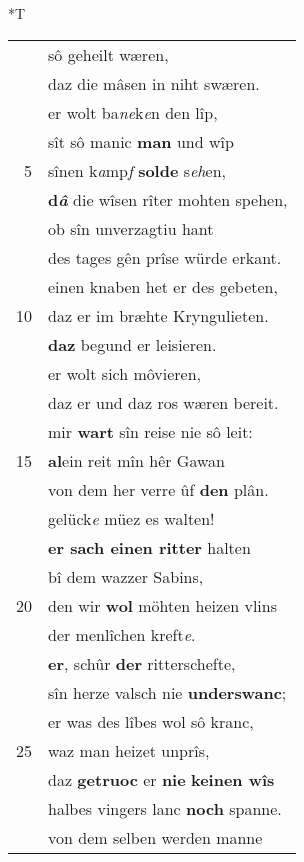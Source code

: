 \documentclass[8pt,a4paper,notitlepage]{article}
\begin{document}
\begin{table}[ht]
\hspace{0.5cm}
\begin{minipage}[t]{0.5\linewidth}
\small
\begin{center}*T
\end{center}
\begin{tabular}{rl}
 & sô geheilt wæren,\\ 
 & daz die mâsen in niht swæren.\\ 
 & er wolt ba\textit{ne}k\textit{e}n den lîp,\\ 
 & sît sô manic \textbf{man} und wîp\\ 
5 & sînen k\textit{a}mp\textit{f} \textbf{solde} s\textit{eh}en,\\ 
 & \textbf{d\textit{â}} die wîsen rîter mohten spehen,\\ 
 & ob sîn unverzagtiu hant\\ 
 & des tages gên prîse würde erkant.\\ 
 & einen knaben het er des gebeten,\\ 
10 & daz er im bræhte Kryngulieten.\\ 
 & \textbf{daz} begund er leisieren.\\ 
 & er wolt sich môvieren,\\ 
 & daz er und daz ros wæren bereit.\\ 
 & mir \textbf{wart} sîn reise nie sô leit:\\ 
15 & \textbf{al}ein reit mîn hêr Gawan\\ 
 & von dem her verre ûf \textbf{den} plân.\\ 
 & gelück\textit{e} müez es walten!\\ 
 & \textbf{er sach einen ritter} halten\\ 
 & bî dem wazzer Sabins,\\ 
20 & den wir \textbf{wol} möhten heizen vlins\\ 
 & der menlîchen kreft\textit{e}.\\ 
 & \textbf{er}, schûr \textbf{der} ritterschefte,\\ 
 & sîn herze valsch nie \textbf{underswanc};\\ 
 & er was des lîbes wol sô kranc,\\ 
25 & waz man heizet unprîs,\\ 
 & daz \textbf{getruoc} er \textbf{nie} \textbf{keinen wîs}\\ 
 & halbes vingers lanc \textbf{noch} spanne.\\ 
 & von dem selben werden manne\\ 

\end{tabular}
\end{minipage}
\end{table}
\end{document}
